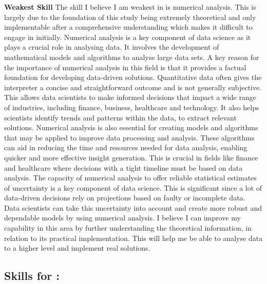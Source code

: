 \documentclass[a4paper, 11pt]{report}
\begin{document}
\textbf{Weakest Skill}
\newline The skill I believe I am weakest in is numerical analysis. This is largely due to the foundation of this study being extremely theoretical and only implementable after a comprehensive understanding which makes it difficult to engage in initially. Numerical analysis is a key component of data science as it plays a crucial role in analysing data. It involves the development of mathematical models and algorithms to analyse large data sets. 
\newline A key reason for the importance of numerical analysis in this field is that it provides a factual foundation for developing data-driven solutions. Quantitative data often gives the interpreter a concise and straightforward outcome and is not generally subjective. This allows data scientists to make informed decisions that impact a wide range of industries, including finance, business, healthcare and technology. It also helps scientists identify trends and patterns within the data, to extract relevant solutions. 
\newline Numerical analysis is also essential for creating models and algorithms that may be applied to improve data processing and analysis. These algorithms can aid in reducing the time and resources needed for data analysis, enabling quicker and more effective insight generation. This is crucial in fields like finance and healthcare where decisions with a tight timeline must be based on data analysis. 
The capacity of numerical analysis to offer reliable statistical estimates of uncertainty is a key component of data science. This is significant since a lot of data-driven decisions rely on projections based on faulty or incomplete data. Data scientists can take this uncertainty into account and create more robust and dependable models by using numerical analysis.
\newline I believe I can improve my capability in this area by further understanding the theoretical information, in relation to its practical implementation. This will help me be able to analyse data to a higher level and implement real solutions. 





\subsection{Skills for \majC: \studC}
\end{document}
